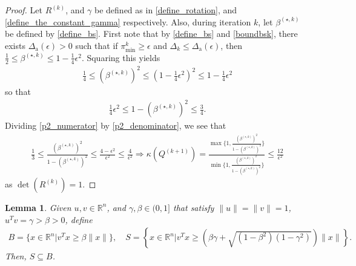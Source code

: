 \documentclass{article}
\newtheorem{lemma}[theorem]{Lemma}
\theoremstyle{case}
\numberwithin{theorem}{subsection}
\newcommand{\bs}{{\beta^{(\star, k)}}}
\newcommand{\ck}{{c^{(k)}}}
\newcommand{\dacco}{{\Delta_{\textrm{a}}}}
\newcommand{\dk}{\Delta_k}
\newcommand{\huk}{{{\hat u}^{(k)}}}
\newcommand{\qk}{{Q^{(k)}}}
\newcommand{\Rn}{\mathbb R^n}
\newcommand{\rotk}{{R^{(k)}}}
\newcommand{\sdk}{{\delta_k}}
\newcommand{\thetamink}{{\pi^k_{\textrm{min}}}}
\newcommand{\xk}{x^{(k)}}
\newcommand{\qkpo}{{Q^{(k+1)}}}
\begin{document}
\begin{proof}
Let $\rotk$, and $\gamma$ be defined as in \cref{define_rotation}, and \cref{define_the_constant_gamma} respectively.
Also, during iteration $k$, let $\bs$ be defined by \cref{define_bs}.
First note that by \cref{define_bs} and \cref{boundbsk}, there exists $\dacco(\epsilon) > 0$ such that if 
$\thetamink \ge \epsilon$ and $\dk \le \dacco(\epsilon)$, then
$\frac {1} 2 \le \bs \le 1 - \frac 1 4 \epsilon^2$.
Squaring this yields
\begin{align}
\frac {1} 4 \le \left(\bs\right)^2 \le \left(1 - \frac 1 4 \epsilon^2\right)^2 \le 1 - \frac 1 4 \epsilon^2 \label{p2_numerator}
\end{align}
so that
\begin{align}
\frac 1 4 \epsilon^2 \le 1 - \left(\bs\right)^2 \le \frac 3 4. \label{p2_denominator}
\end{align}
Dividing \cref{p2_numerator} by \cref{p2_denominator}, we see that
\begin{align*}
\frac 1 3
\le \frac{\left(\bs\right)^2}{1 - \left(\bs\right)^2}
\le \frac {4 - \epsilon^2}{\epsilon^2} \le \frac {4}{\epsilon^2}
\Longrightarrow 
\kappa(\qkpo) 
= \frac{\max\{1, \frac{\left(\bs\right)^2}{1 - \left(\bs\right)^2}\}}{\min\{1, \frac{\left(\bs\right)^2}{1 - \left(\bs\right)^2}\}} 
\le \frac {12}{\epsilon^2}
\end{align*}
as $\det(\rotk) = 1$.
\end{proof}




\begin{lemma}
\label{cone_subset_cone}
Given $u, v \in \Rn$, and $\gamma, \beta \in (0, 1]$ that satisfy $\|u\| = \|v\|= 1$, $u^Tv = \gamma > \beta > 0$, define
\begin{align*}
B = \{x\in\Rn | {v}^Tx \ge \beta\|x\|\}, \quad
S = \left\{x\in\Rn \bigg| v^Tx \ge \left(\beta\gamma + \sqrt{(1 - \beta^2)\left(1 - \gamma^2\right)}\right)\|x\| \right\}. 
\end{align*}
Then, $S \subseteq B$.
\end{lemma}
\end{document}
